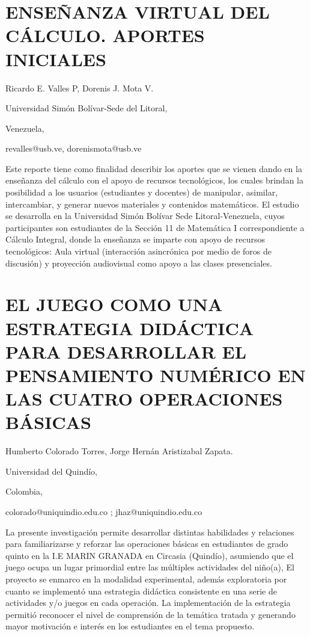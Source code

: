 \section{ENSEÑANZA VIRTUAL DEL CÁLCULO. APORTES INICIALES}

\begin{datos}

Ricardo E. Valles P, Dorenis J. Mota V. 

Universidad Simón Bolívar-Sede del Litoral,

Venezuela,

revalles@usb.ve, dorenismota@usb.ve

\end{datos}

Este reporte tiene como finalidad describir los aportes que se vienen
dando en la enseñanza del cálculo con el apoyo de recursos tecnológicos,
los cuales brindan la posibilidad a los usuarios (estudiantes y docentes)
de manipular, asimilar, intercambiar, y generar nuevos materiales
y contenidos matemáticos. El estudio se desarrolla en la Universidad
Simón Bolívar Sede Litoral-Venezuela, cuyos participantes son estudiantes
de la Sección 11 de Matemática I correspondiente a Cálculo Integral,
donde la enseñanza se imparte con apoyo de recursos tecnológicos:
Aula virtual (interacción asincrónica por medio de foros de discusión)
y proyección audiovisual como apoyo a las clases presenciales.


\section{EL JUEGO COMO UNA ESTRATEGIA DIDÁCTICA PARA DESARROLLAR EL PENSAMIENTO
NUMÉRICO EN LAS CUATRO OPERACIONES BÁSICAS }

\begin{datos}

Humberto Colorado Torres, Jorge Hernán Aristizabal Zapata.

Universidad del Quindío, 

Colombia,

colorado@uniquindio.edu.co ; jhaz@uniquindio.edu.co

\end{datos}

La presente investigación permite desarrollar distintas habilidades
y relaciones para familiarizarse y reforzar las operaciones básicas
en estudiantes de grado quinto en la I.E MARIN GRANADA en Circasia
(Quindío), asumiendo que el juego ocupa un lugar primordial entre
las múltiples actividades del niño(a), El proyecto se enmarco en la
modalidad experimental, además exploratoria por cuanto se implementó
una estrategia didáctica consistente en una serie de actividades y/o
juegos en cada operación. La implementación de la estrategia permitió
reconocer el nivel de comprensión de la temática tratada y generando
mayor motivación e interés en los estudiantes en el tema propuesto. 


